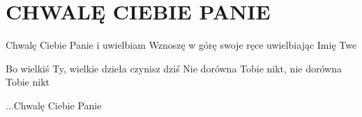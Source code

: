 \documentclass[../../../songbook.tex]{subfiles}
\begin{document}
\TabPositions{8cm} %
\section*{CHWALĘ CIEBIE PANIE}
\vspace{0.5cm}

Chwalę Ciebie Panie i uwielbiam				 \newline
Wznoszę w górę swoje ręce uwielbiając Imię Twe		 \newline

\-\hspace{0.1cm} Bo wielkiś Ty, wielkie dzieła czynisz dziś		 \newline
\-\hspace{0.1cm} Nie dorówna Tobie nikt, nie dorówna Tobie nikt	 \newline

...Chwalę Ciebie Panie		 \newline
\end{document}
